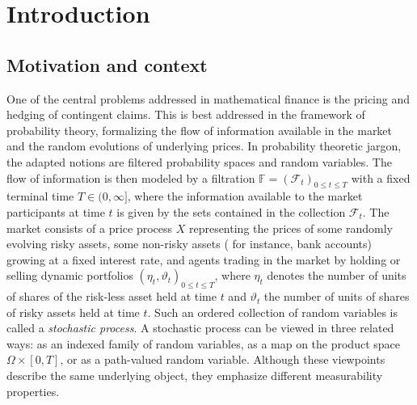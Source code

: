 \documentclass[11pt,a4paper,twoside,openany]{report}
\numberwithin{equation}{section}
\theoremstyle{plain} %
\theoremstyle{definition} %
\theoremstyle{remark} %
\begin{document}
\cleardoublepage



\chapter{Introduction}
\label{chap:introduction}

\section{Motivation and context}
\label{sec:introduction-motivation-context}
One of the central problems addressed in mathematical finance is the pricing and hedging of contingent claims. This is best addressed in the framework of probability theory, formalizing the flow of information available in the market and the random evolutions of underlying prices. In probability theoretic jargon, the adapted notions are filtered probability spaces and random variables. The flow of information is then modeled by a filtration \(\mathbb{F}=(\mathcal{F}_t)_{0\leq t\leq T}\) with a fixed terminal time \(T\in(0,\infty]\), where the information available to the market participants at time \(t\) is given by the sets contained in the collection \(\mathcal{F}_t\). The market consists of a price process \(X\) representing the prices of some randomly evolving risky assets, some non-risky assets ( for instance, bank accounts) growing at a fixed interest rate, and agents trading in the market by holding or selling dynamic portfolios \((\eta_t,\vartheta_t)_{0\leq t\leq T}\), where \(\eta_t\) denotes the number of units of shares of the risk-less asset held at time \(t\) and \(\vartheta_t\) the number of units of shares of risky assets held at time \(t\). 
Such an ordered collection of random variables is called a \textit{stochastic process}. A stochastic process can be viewed in three related ways: as an indexed family of random variables, as a map on the product space \(\Omega\times[0,T]\), or as a path-valued random variable. Although these viewpoints describe the same underlying object, they emphasize different measurability properties. 
\end{document}
